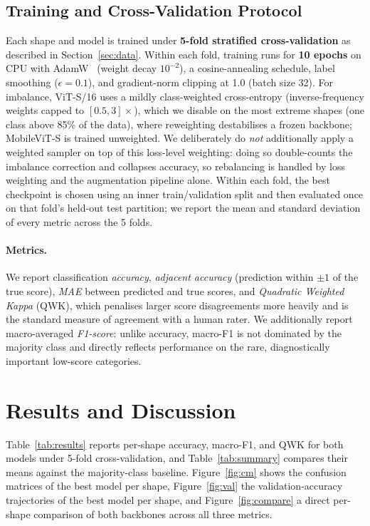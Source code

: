 \documentclass[10pt,twocolumn,letterpaper]{article}
\begin{document}
\subsection{Training and Cross-Validation Protocol}
Each shape and model is trained under \textbf{5-fold stratified
cross-validation} as described in Section~\ref{sec:data}. Within each fold,
training runs for \textbf{10 epochs} on CPU with AdamW~\cite{adamw} (weight
decay $10^{-2}$), a cosine-annealing schedule, label smoothing
($\epsilon{=}0.1$), and gradient-norm clipping at 1.0 (batch size 32). For
imbalance, ViT-S/16 uses a mildly class-weighted cross-entropy
(inverse-frequency weights capped to $[0.5,3]\times$), which we disable on the
most extreme shapes (one class above 85\% of the data), where reweighting
destabilises a frozen backbone; MobileViT-S is trained unweighted. We
deliberately do \emph{not} additionally apply a weighted sampler on top of
this loss-level weighting: doing so double-counts the imbalance correction and
collapses accuracy, so rebalancing is handled by loss weighting and the
augmentation pipeline alone. Within each fold, the best checkpoint is chosen
using an inner train/validation split and then evaluated once on that fold's
held-out test partition; we report the mean and standard deviation of every
metric across the 5 folds.

\paragraph{Metrics.}
We report classification \emph{accuracy}, \emph{adjacent accuracy} (prediction
within $\pm1$ of the true score), \emph{MAE} between predicted and true scores,
and \emph{Quadratic Weighted Kappa} (QWK), which penalises larger score
disagreements more heavily and is the standard measure of agreement with a
human rater. We additionally report macro-averaged \emph{F1-score}: unlike
accuracy, macro-F1 is not dominated by the majority class and directly
reflects performance on the rare, diagnostically important low-score
categories.

\section{Results and Discussion}
\label{sec:results}

Table~\ref{tab:results} reports per-shape accuracy, macro-F1, and QWK for both
models under 5-fold cross-validation, and Table~\ref{tab:summary} compares
their means against the majority-class baseline. Figure~\ref{fig:cm} shows the
confusion matrices of the best model per shape, Figure~\ref{fig:val} the
validation-accuracy trajectories of the best model per shape, and
Figure~\ref{fig:compare} a direct per-shape comparison of both backbones
across all three metrics.
\end{document}
